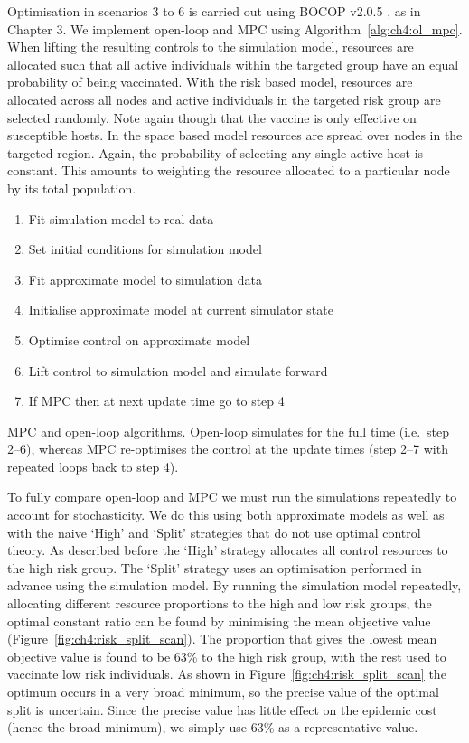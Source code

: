 Optimisation in scenarios 3 to 6 is carried out using BOCOP v2.0.5 \citep{bocop}, as in Chapter 3. We implement open-loop and MPC using Algorithm~\ref{alg:ch4:ol_mpc}. When lifting the resulting controls to the simulation model, resources are allocated such that all active individuals within the targeted group have an equal probability of being vaccinated. With the risk based model, resources are allocated across all nodes and active individuals in the targeted risk group are selected randomly. Note again though that the vaccine is only effective on susceptible hosts. In the space based model resources are spread over nodes in the targeted region. Again, the probability of selecting any single active host is constant. This amounts to weighting the resource allocated to a particular node by its total population.
 
\begin{algorithm}
    \begin{enumerate}
        \item{}Fit simulation model to real data
        \item{}Set initial conditions for simulation model
        \item{}Fit approximate model to simulation data
        \item{}Initialise approximate model at current simulator state
        \item{}Optimise control on approximate model
        \item{}Lift control to simulation model and simulate forward
        \item{}If MPC then at next update time go to step 4
    \end{enumerate}
\caption{MPC and open-loop algorithms. Open-loop simulates for the full time (i.e.\ step 2--6), whereas MPC re-optimises the control at the update times (step 2--7 with repeated loops back to step 4).\label{alg:ch4:ol_mpc}}
\end{algorithm}

To fully compare open-loop and MPC we must run the simulations repeatedly to account for stochasticity. We do this using both approximate models as well as with the naive `High' and `Split' strategies that do not use optimal control theory. As described before the `High' strategy allocates all control resources to the high risk group. The `Split' strategy uses an optimisation performed in advance using the simulation model. By running the simulation model repeatedly, allocating different resource proportions to the high and low risk groups, the optimal constant ratio can be found by minimising the mean objective value (Figure~\ref{fig:ch4:risk_split_scan}). The proportion that gives the lowest mean objective value is found to be 63\% to the high risk group, with the rest used to vaccinate low risk individuals. As shown in Figure~\ref{fig:ch4:risk_split_scan} the optimum occurs in a very broad minimum, so the precise value of the optimal split is uncertain. Since the precise value has little effect on the epidemic cost (hence the broad minimum), we simply use 63\% as a representative value.

